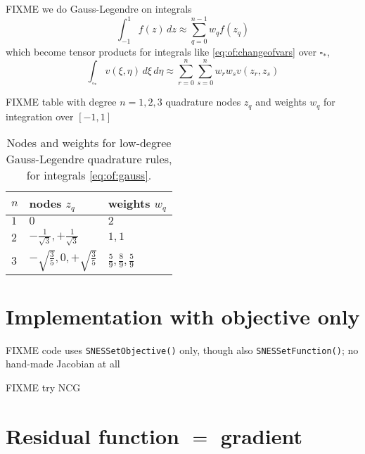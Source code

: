 FIXME we do Gauss-Legendre on integrals
\begin{equation}
\int_{-1}^1 f(z)\,dz \approx \sum_{q=0}^{n-1} w_q f(z_q)  \label{eq:of:gauss}
\end{equation}
which become tensor products for integrals like \eqref{eq:of:changeofvars} over $\square_\ast$,
\begin{equation}
\int_{\square_\ast} v(\xi,\eta) \,d\xi\,d\eta \approx \sum_{r=0}^n \sum_{s=0}^n w_r w_s v(z_r,z_s)  \label{eq:of:tensorgauss}
\end{equation}

FIXME table with degree $n=1,2,3$ quadrature nodes $z_q$ and weights $w_q$ for integration over $[-1,1]$

\begin{table}
\begin{tabular}{lll}
$n$\phantom{foobar} & nodes $z_q$\phantom{foo} & weights $w_q$ \\ \hline
$1$ & $0$ & $2$ \\
$2$ & $-\frac{1}{\sqrt{3}}, +\frac{1}{\sqrt{3}}$ & $1,1$ \\
$3$ & $-\sqrt{\frac{3}{5}}, 0, +\sqrt{\frac{3}{5}}$ & $\frac{5}{9}, \frac{8}{9}, \frac{5}{9}$ \\
\end{tabular}
\caption{Nodes and weights for low-degree Gauss-Legendre quadrature rules, for integrals \eqref{eq:of:gauss}.} \label{tab:of:gauss}
\end{table}


\section{Implementation with objective only}

FIXME code uses \texttt{SNESSetObjective()} only, though also \texttt{SNESSetFunction()}; no hand-made Jacobian at all

FIXME try NCG






\section{Residual function $=$ gradient}

